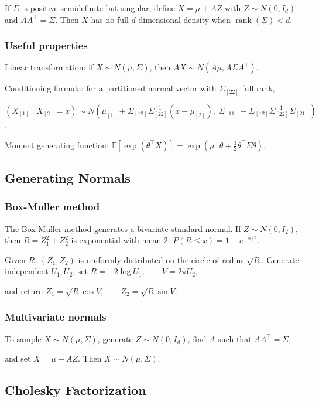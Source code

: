 If $\Sigma$ is positive semidefinite but singular, define $X=\mu+AZ$ with $Z\sim N(0,I_d)$ and $AA^\top=\Sigma$. Then $X$ has no full $d$-dimensional density when $\operatorname{rank}(\Sigma)<d$.

\subsubsection*{Useful properties}

Linear transformation: if $X\sim N(\mu,\Sigma)$, then
$AX\sim N(A\mu,A\Sigma A^\top)$.

Conditioning formula: for a partitioned normal vector with $\Sigma_{[22]}$ full rank,

$(X_{[1]}\mid X_{[2]}=x)\sim N(\mu_{[1]}+\Sigma_{[12]}\Sigma_{[22]}^{-1}(x-\mu_{[2]}),\ \Sigma_{[11]}-\Sigma_{[12]}\Sigma_{[22]}^{-1}\Sigma_{[21]})$.

Moment generating function:
$\mathbb{E}[\exp(\theta^\top X)]=\exp(\mu^\top\theta+\frac12\theta^\top\Sigma\theta)$.

\subsection{Generating Normals}

\subsubsection*{Box-Muller method}

The Box-Muller method generates a bivariate standard normal. If $Z\sim N(0,I_2)$, then $R=Z_1^2+Z_2^2$ is exponential with mean $2$:
$P(R\le x)=1-e^{-x/2}$.

Given $R$, $(Z_1,Z_2)$ is uniformly distributed on the circle of radius $\sqrt{R}$. Generate independent $U_1,U_2$, set
$R=-2\log U_1,\qquad V=2\pi U_2$,

and return
$Z_1=\sqrt{R}\cos V,\qquad Z_2=\sqrt{R}\sin V$.

\subsubsection*{Multivariate normals}

To sample $X\sim N(\mu,\Sigma)$, generate $Z\sim N(0,I_d)$, find $A$ such that
$AA^\top=\Sigma$,

and set $X=\mu+AZ$. Then $X\sim N(\mu,\Sigma)$.

\subsection{Cholesky Factorization}

